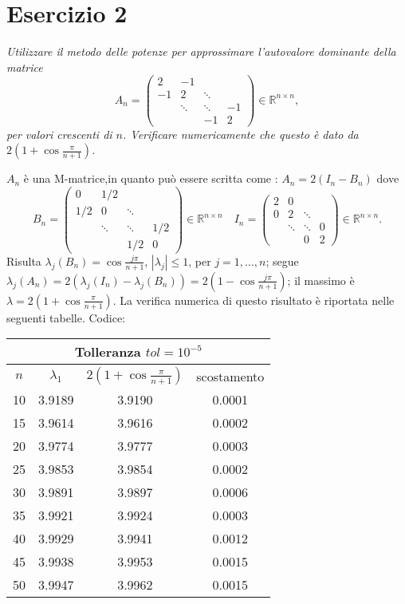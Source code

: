 \section{Esercizio 2}
\label{sub:Es2}
\emph{
      Utilizzare il metodo delle potenze per approssimare l'autovalore dominante della matrice
			\[
				A_n=\begin{pmatrix}
					2 & -1 & &\\
					-1 & 2 & \ddots &\\
					& \ddots & \ddots & -1\\
					& & -1 & 2
				\end{pmatrix}\in\mathbb{R}^{n\times n},
			\]
			per valori crescenti di $n$. Verificare numericamente che questo è dato da $2\left(1+\cos\frac{\pi}{n+1}\right)$.
}
\begin{sol}
  \normalfont
  $A_n$ è una M-matrice,in quanto può essere scritta come : $A_n=2(I_n-B_n)$ dove
  $$B_n=\begin{pmatrix}0&1/2&&\\1/2&0&\ddots&\\&\ddots&\ddots&1/2\\&&1/2&0\end{pmatrix}\in\mathbb{R}^{n\times n} \quad I_n=\begin{pmatrix}2&0&&\\0&2&\ddots&\\&\ddots&\ddots&0\\&&0&2\end{pmatrix}\in\mathbb{R}^{n\times n}.$$
  Risulta $\lambda_j(B_n)=\cos{\frac{j\pi}{n+1}}$, $|\lambda_j|\leq 1$, per $j=1,\ldots,n$;
  segue $\lambda_j(A_n)=2(\lambda_j(I_n)-\lambda_j(B_n))=2(1-\cos{\frac{j\pi}{n+1}})$; il massimo è $\lambda=2(1+\cos{\frac{\pi}{n+1}})$.
  La verifica numerica di questo risultato è riportata nelle seguenti tabelle.
  Codice:\\
  
  \vspace{0.5em}
  \begin{center}\begin{tabular}{c|c|c|c}
    \hline\multicolumn{4}{c}{Tolleranza $tol=10^{-5}$}\\\hline
    $n$ & $\lambda_1$ & $2\left(1+\cos{\frac{\pi}{n+1}}\right)$ & scostamento\\\hline
    10 & 3.9189 & 3.9190 & 0.0001 \\
    15 & 3.9614 & 3.9616 & 0.0002 \\
    20 & 3.9774 & 3.9777 & 0.0003 \\
    25 & 3.9853 & 3.9854 & 0.0002 \\
    30 & 3.9891 & 3.9897 & 0.0006 \\
    35 & 3.9921 & 3.9924 & 0.0003 \\
    40 & 3.9929 & 3.9941 & 0.0012 \\
    45 & 3.9938 & 3.9953 & 0.0015 \\
    50 & 3.9947 & 3.9962 & 0.0015
  \end{tabular}\end{center}


\end{sol}
